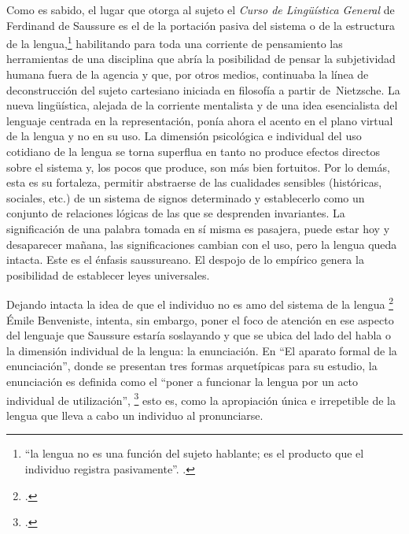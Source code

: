 Como es sabido, el lugar que otorga al sujeto el \emph{Curso de Lingüística General} de Ferdinand de Saussure es el de la portación pasiva del sistema o de la estructura de la lengua,\footnote{\enquote{la lengua no es una función del sujeto hablante; es el producto que el individuo registra pasivamente}. \cite[][63]{@6996-SAUSSURE2007}.} habilitando para toda una corriente de pensamiento las herramientas de una disciplina que abría la posibilidad de pensar la subjetividad humana fuera de la agencia y que, por otros medios, continuaba la línea de deconstrucción del sujeto cartesiano iniciada en filosofía a partir de~Nietzsche. La nueva lingüística, alejada de la corriente mentalista y de una idea esencialista del lenguaje centrada en la representación, ponía ahora el acento en el plano virtual de la lengua y no en su uso. La dimensión psicológica e individual del uso cotidiano de la lengua se torna superflua en tanto no produce efectos directos sobre el sistema y, los pocos que produce, son más bien fortuitos. Por lo demás, esta es su fortaleza, permitir abstraerse de las cualidades sensibles (históricas, sociales, etc.) de un sistema de signos determinado y establecerlo como un conjunto de relaciones lógicas de las que se desprenden invariantes. La significación de una palabra tomada en sí misma es pasajera, puede estar hoy y desaparecer mañana, las significaciones cambian con el uso, pero la lengua queda intacta. Este es el énfasis saussureano. El despojo de lo empírico genera la posibilidad de establecer leyes universales.

Dejando intacta la idea de que el individuo no es amo del sistema de la lengua  \footcite[][98]{@7076-BENVENISTE2008} Émile Benveniste, intenta, sin embargo, poner el foco de atención en ese aspecto del lenguaje que Saussure estaría soslayando y que se ubica del lado del habla o la dimensión individual de la lengua: la enunciación. En \enquote{El aparato formal de la enunciación}, donde se presentan tres formas arquetípicas para su estudio, la enunciación es definida como el \enquote{poner a funcionar la lengua por un acto individual de utilización}, \footcite[][83]{@7076-BENVENISTE2008} esto es, como la apropiación única e irrepetible de la lengua que lleva a cabo un individuo al pronunciarse.

